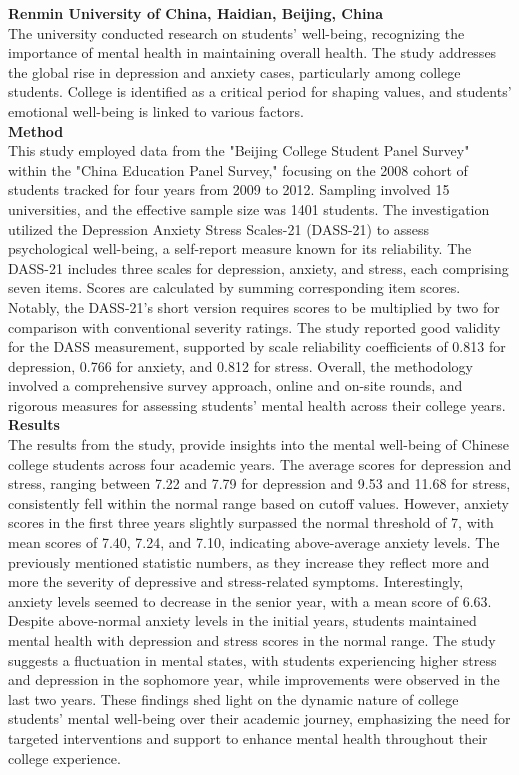 \documentclass[11pt]{report}
\begin{document}
\textbf{Renmin University of China, Haidian, Beijing, China \cite{research-2}}
\\ \normalsize The university conducted research on students' well-being, recognizing the importance of mental health in maintaining overall health. The study addresses the global rise in depression and anxiety cases, particularly among college students. College is identified as a critical period for shaping values, and students' emotional well-being is linked to various factors.\vspace{5mm} \\
\textbf{Method} \\
This study employed data from the "Beijing College Student Panel Survey" within the "China Education Panel Survey," focusing on the 2008 cohort of students tracked for four years from 2009 to 2012. Sampling involved 15 universities, and the effective sample size was 1401 students. The investigation utilized the Depression Anxiety Stress Scales-21 (DASS-21) to assess psychological well-being, a self-report measure known for its reliability. The DASS-21 includes three scales for depression, anxiety, and stress, each comprising seven items. Scores are calculated by summing corresponding item scores. Notably, the DASS-21's short version requires scores to be multiplied by two for comparison with conventional severity ratings. The study reported good validity for the DASS measurement, supported by scale reliability coefficients of 0.813 for depression, 0.766 for anxiety, and 0.812 for stress. Overall, the methodology involved a comprehensive survey approach, online and on-site rounds, and rigorous measures for assessing students' mental health across their college years.\vspace{5mm} \\
\textbf{Results} \\
The results from the study, provide insights into the mental well-being of Chinese college students across four academic years. The average scores for depression and stress, ranging between 7.22 and 7.79 for depression and 9.53 and 11.68 for stress, consistently fell within the normal range based on cutoff values. However, anxiety scores in the first three years slightly surpassed the normal threshold of 7, with mean scores of 7.40, 7.24, and 7.10, indicating above-average anxiety levels. The previously mentioned statistic numbers, as they increase they reflect more and more the severity of depressive and stress-related symptoms. Interestingly, anxiety levels seemed to decrease in the senior year, with a mean score of 6.63. Despite above-normal anxiety levels in the initial years, students maintained mental health with depression and stress scores in the normal range. The study suggests a fluctuation in mental states, with students experiencing higher stress and depression in the sophomore year, while improvements were observed in the last two years. These findings shed light on the dynamic nature of college students' mental well-being over their academic journey, emphasizing the need for targeted interventions and support to enhance mental health throughout their college experience.\vspace{5mm} \\
\end{document}
